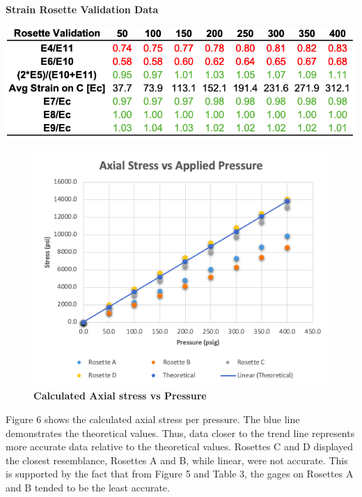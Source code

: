 \documentclass[12pt]{article}
\begin{document}
\begin{table}[H]
  \caption{\textbf{Strain Rosette Validation Data }}
  \includegraphics[width=\linewidth]{table_rosette_ratios}
  \centering
\end{table}

\begin{figure} [H]
	\centering
	\includegraphics [width=\textwidth]{plot_axialvspressure}
	\caption{ \textbf{Calculated Axial stress vs  Pressure}}
\end{figure} 
Figure 6 shows the calculated axial stress per pressure. The blue line demonstrates the 
theoretical values. Thus, data closer to the trend line represents more accurate data relative to the theoretical values. Rosettes C and D displayed the closest resemblance, Rosettes A and B,
while linear, were not accurate. This is supported by the fact that from Figure 5 and 
Table 3, the gages on Rosettes A and B tended to be the least accurate. 
\end{document}
